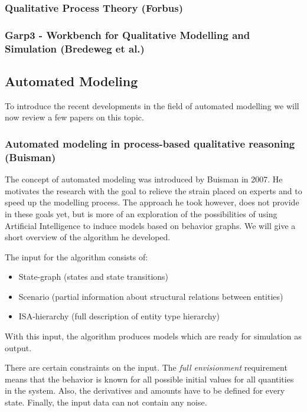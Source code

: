 \documentclass{article}
\begin{document}

\subsubsection{Qualitative Process Theory (Forbus)}

\subsubsection{Garp3 - Workbench for Qualitative Modelling and Simulation (Bredeweg et al.)}

\subsection{Automated Modeling}

To introduce the recent developments in the field of automated modelling we
will now review a few papers on this topic.

\subsubsection{Automated modeling in process-based qualitative reasoning
(Buisman)}
The concept of automated modeling was introduced by Buisman \cite{buisman} in
2007. He motivates the research with the goal to relieve the strain placed on
experts and to speed up the modelling process. The approach he took however,
does not provide in these goals yet, but is more of an exploration of the
possibilities of using Artificial Intelligence to induce models based on
behavior graphs. We will give a short overview of the algorithm he developed.

The input for the algorithm consists of:
\begin{itemize}
\item State-graph (states and state transitions)
\item Scenario (partial information about structural relations between entities)
\item ISA-hierarchy (full description of entity type hierarchy)
\end{itemize}
With this input, the algorithm produces models which are ready for simulation as
output.

There are certain constraints on the input. The \emph{full envisionment}
requirement means that the behavior is known for all possible initial values for
all quantities in the system. Also, the derivatives and amounts have to be
defined for every state. Finally, the input data can not contain any noise.
\end{document}
